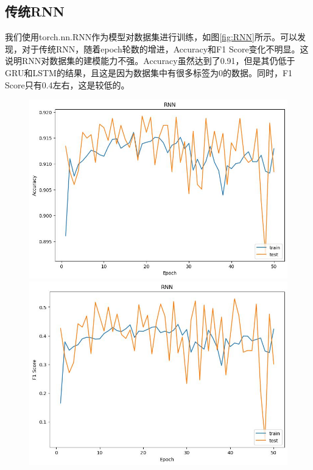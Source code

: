 \documentclass[UTF8]{article}
\begin{document}
\subsection{传统RNN}
我们使用torch.nn.RNN作为模型对数据集进行训练，如图\ref{fig:RNN}所示。可以发现，对于传统RNN，随着epoch轮数的增进，Accuracy和F1 Score变化不明显。这说明RNN对数据集的建模能力不强。Accuracy虽然达到了0.91，但是其仍低于GRU和LSTM的结果，且这是因为数据集中有很多标签为0的数据。同时，F1 Score只有0.4左右，这是较低的。

\begin{figure}[h]
    \centering
    \begin{minipage}{.43\linewidth}
        \centering
        \includegraphics[width=\linewidth]{../figure/RNN_Accuracy.jpg}
    \end{minipage}
    \begin{minipage}{.43\linewidth}
        \centering
        \includegraphics[width=\linewidth]{../figure/RNN_F1.jpg}
    \end{minipage}


\end{figure}
\end{document}
